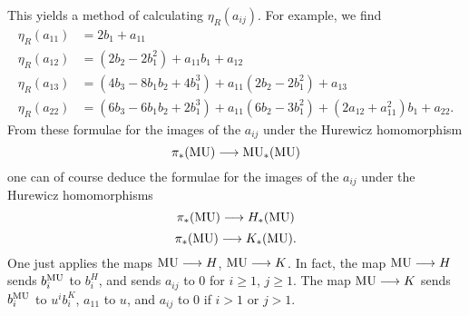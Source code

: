 \documentclass[../main]{subfiles}
\begin{document}
This yields a method of calculating $\eta_R(a_{ij})$. For example, we find
\begin{align*}
    \eta_R(a_{11})&=2b_1+a_{11} \\ 
    \eta_R(a_{12})&=(2b_2-2b_1^2)+a_{11}b_1 + a_{12 } \\ 
    \eta_R(a_{13})&=(4b_3-8b_1b_2+4b_1^3)+a_{11}(2b_2-2b_1^2) + a_{13} \\ 
    \eta_R(a_{22})&=(6b_3-6b_1b_2+2b_1^3)+a_{11}(6b_2-3b_1^2) + (2a_{12}+a_{11}^2)b_1+a_{22}. 
\end{align*}
From these formulae for the images of the $a_{ij}$ under the Hurewicz homomorphism
\[\pi_\ast(\mathrm{MU})\longrightarrow \mathrm{MU}_{\ast}(\mathrm{MU})\]
one can of course deduce the formulae for the images of the $a_{ij}$ under the Hurewicz homomorphisms
\[\pi_\ast(\mathrm{MU})\longrightarrow H_\ast(\mathrm{MU})\]
\[\pi_\ast(\mathrm{MU})\longrightarrow K_\ast(\mathrm{MU}).\]
One just applies the maps $\mathrm{MU}\longrightarrow H$, $\mathrm{MU}\longrightarrow K$. In fact, the map $\mathrm{MU}\longrightarrow H$ sends $b_i^{\mathrm{MU}}$ to $b_i^H$, and sends $a_{ij}$ to $0$ for $i\geq 1$, $j\geq 1$. The map $\mathrm{MU}\longrightarrow K$ sends $b_i^{\mathrm{MU}}$ to $u^ib_i^K$, $a_{11}$ to $u$, and $a_{ij}$ to $0$ if $i>1$ or $j>1$.
\end{document}
